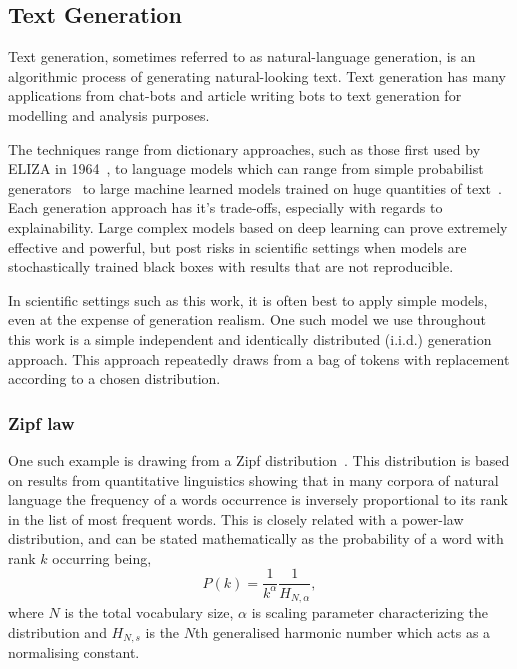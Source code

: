 \subsection{Text Generation}\label{sec:textgeneration}

Text generation, sometimes referred to as natural-language generation, is an algorithmic process of generating natural-looking text. Text generation has many applications from chat-bots and article writing bots to text generation for modelling and analysis purposes.

The techniques range from dictionary approaches, such as those first used by ELIZA in 1964~\cite{weizenbaum_computer_1976}, to language models which can range from simple probabilist generators~\cite{reiter2000building} to large machine learned models trained on huge quantities of text~\cite{perera2017recent}. Each generation approach has it's trade-offs, especially with regards to explainability. Large complex models based on deep learning can prove extremely effective and powerful, but post risks in scientific settings when models are stochastically trained black boxes with results that are not reproducible.

In scientific settings such as this work, it is often best to apply simple models, even at the expense of generation realism. One such model we use throughout this work is a simple independent and identically distributed (i.i.d.) generation approach. This approach repeatedly draws from a bag of tokens with replacement according to a chosen distribution. 

\subsubsection{Zipf law}
One such example is drawing from a Zipf distribution~\cite{george1935zipf,zipf_human_1949}. This distribution is based on results from quantitative linguistics showing that in many corpora of natural language the frequency of a words occurrence is inversely proportional to its rank in the list of most frequent words. This is closely related with a power-law distribution, and can be stated mathematically as the probability of a word with rank $k$ occurring being,
\begin{equation}
P(k) = \frac{1}{k^\alpha}\frac{1}{H_{N,\alpha}},
\end{equation}
where $N$ is the total vocabulary size, $\alpha$ is scaling parameter characterizing the distribution and $H_{N,s}$ is the $N$th generalised harmonic number which acts as a normalising constant. 

